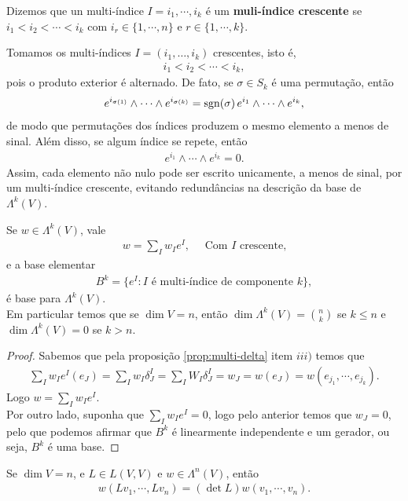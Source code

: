 \begin{definition}
  Dizemos que un multi-índice $I=i_1,\cdots,i_k$ é um \textbf{muli-índice crescente} se $i_1<i_2<\cdots<i_k$ com $i_r\in\{1,\cdots,n\}$ e $r\in\{1,\cdots,k\}$.
\end{definition}
Tomamos os multi-índices $I=(i_{1},\dots,i_{k})$ crescentes, isto é,
\begin{align*}
  i_{1}<i_{2}<\cdots<i_{k},
\end{align*}
pois o produto exterior é alternado. De fato, se $\sigma\in S_{k}$ é uma permutação, então
\begin{align*}
  e^{i_{\sigma(1)}}\wedge\cdots\wedge e^{i_{\sigma(k)}}=\operatorname{sgn}(\sigma)\,e^{i_{1}}\wedge\cdots\wedge e^{i_{k}},
\end{align*}
de modo que permutações dos índices produzem o mesmo elemento a menos de sinal. Além disso, se algum índice se repete, então
\begin{align*}
  e^{i_{1}}\wedge\cdots\wedge e^{i_{k}}=0. 
\end{align*}
Assim, cada elemento não nulo pode ser escrito unicamente, a menos de sinal, por um multi-índice crescente, evitando redundâncias na descrição da base de $\Lambda^{k}(V)$.
\begin{proposition}
  Se $w\in\Lambda^{k}(V)$, vale
  \begin{align*}
    w=\sum_{I}w_{I}e^{I},\quad\text{ Com $I$ crescente,}
  \end{align*}
  e a base elementar
  \begin{align*}
    B^{k}=\{e^{I}:I\text{ é multi-índice de componente }k\},
  \end{align*}
  é base para $\Lambda^{k}(V)$.\\
  Em particular temos que se $\dim V=n$, então $\dim\Lambda^{k}(V)=\binom{n}{k}$ se $k\leq n$ e $\dim\Lambda^{k}(V)=0$ se $k>n$. 
\end{proposition}
\begin{proof} 
  Sabemos que pela proposição \ref{prop:multi-delta} item $iii)$ temos que
  \begin{align*}
    \sum_{I}w_Ie^{I}(e_J)=\sum_{I}w_{I}\delta_{J}^{I}=\sum_{I}W_I\delta_{J}^{I}=w_{J}=w(e_J)=w(e_{j_1},\cdots,e_{j_k}).
  \end{align*}
  Logo $w=\sum_{I}w_Ie^{I}$.\\
  Por outro lado, suponha que $\sum_{I}w_Ie^{I}=0$, logo pelo anterior temos que $w_J=0$, pelo que podemos afirmar que $B^{k}$ é linearmente independente e um gerador, ou seja, $B^{k}$ é uma base. 
\end{proof}
\begin{corollary}
  Se $\dim V=n$, e $L\in L(V,V)$ e $w\in\Lambda^{n}(V)$, então
  \begin{align*}
    w(Lv_1,\cdots,Lv_n)=(\det L)w(v_1,\cdots,v_n).
  \end{align*}
\end{corollary}
